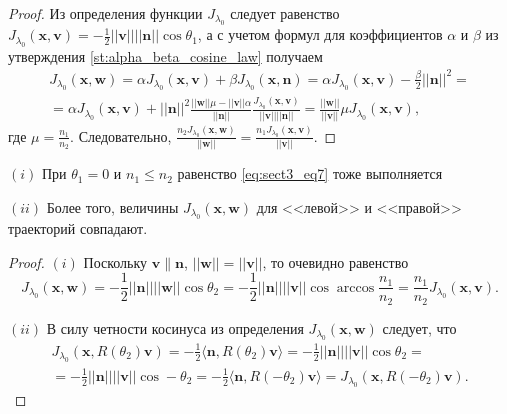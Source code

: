 \begin{proof}
Из определения функции $J_{\lambda_0}$ следует равенство $J_{\lambda_0}(\mathbf{x}, \mathbf{v}) = -\frac{1}{2}||\mathbf{v}|| ||\mathbf{n}|| \cos \theta_1$, а с учетом формул для коэффициентов $\alpha$ и $\beta$ из утверждения \ref{st:alpha_beta_cosine_law} получаем 
\begin{multline*}
    J_{\lambda_0}(\mathbf{x}, \mathbf{w}) = \alpha J_{\lambda_0}(\mathbf{x}, \mathbf{v}) + \beta J_{\lambda_0}(\mathbf{x}, \mathbf{n}) = \alpha J_{\lambda_0}(\mathbf{x}, \mathbf{v}) - \frac{\beta}{2}||\mathbf{n}||^2 = \\ =\alpha J_{\lambda_0}(\mathbf{x}, \mathbf{v}) + ||\mathbf{n}||^2\frac{||\mathbf{w}||\mu-||\mathbf{v}||\alpha}{||\mathbf{n}||}\frac{J_{\lambda_0}(\mathbf{x}, \mathbf{v})}{||\mathbf{v}|| ||\mathbf{n}||} = 
\frac{||\mathbf{w}||}{||\mathbf{v}||}\mu J_{\lambda_0}(\mathbf{x}, \mathbf{v}),
\end{multline*}
где $\mu=\frac{n_1}{n_2}$. Следовательно, 
$
\frac{n_2 J_{\lambda_0}(\mathbf{x}, \mathbf{w})}{||\mathbf{w}||} = 
\frac{n_1 J_{\lambda_0}(\mathbf{x}, \mathbf{v})}{||\mathbf{v}||}.
$
\end{proof}

\begin{statement}
    
    $(i)$ При $\theta_1=0$ и $n_1 \leq n_2$ равенство
    \eqref{eq:sect3_eq7} тоже выполняется 
    
    $(ii)$ Более того, величины $J_{\lambda_0}(\mathbf{x}, \mathbf{w})$ для <<левой>> и <<правой>> траекторий совпадают.
\end{statement}
\begin{proof}

$(i)$ Поскольку $\mathbf{v} \| \mathbf{n}$, $||\mathbf{w}|| = ||\mathbf{v}||$,  то очевидно равенство 
    $$J_{\lambda_0}(\mathbf{x}, \mathbf{w}) 
    = -\frac{1}{2}||\mathbf{n}||||\mathbf{w}|| \cos \theta_2 
    = -\frac{1}{2}||\mathbf{n}||||\mathbf{v}|| \cos \arccos \frac{n_1}{n_2} 
    = \frac{n_1}{n_2} J_{\lambda_0}(\mathbf{x}, \mathbf{v}).$$

$(ii)$ В силу четности косинуса из определения $J_{\lambda_0}(\mathbf{x}, \mathbf{w})$ следует, что
\begin{multline*}
J_{\lambda_0}(\mathbf{x}, R(\theta_2) \mathbf{v})
=-\frac{1}{2}\langle\mathbf{n},  R(\theta_2) \mathbf{v}\rangle
=-\frac{1}{2}||\mathbf{n}||||\mathbf{v}|| \cos \theta_2 = \\
=-\frac{1}{2}||\mathbf{n}||||\mathbf{v}|| \cos -\theta_2 
=-\frac{1}{2}\langle\mathbf{n},  R(-\theta_2) \mathbf{v}\rangle
=J_{\lambda_0}(\mathbf{x}, R(-\theta_2) \mathbf{v}).
\end{multline*}
\end{proof}

